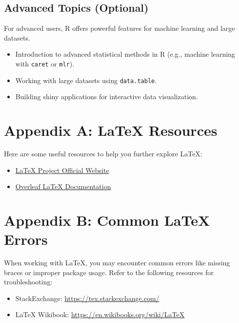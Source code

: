 \documentclass[12pt]{book}
\begin{document}
\section{Advanced Topics (Optional)}
For advanced users, R offers powerful features for machine learning and large datasets.
\begin{itemize}
    \item Introduction to advanced statistical methods in R (e.g., machine learning with \texttt{caret} or \texttt{mlr}).
    \item Working with large datasets using \texttt{data.table}.
    \item Building shiny applications for interactive data visualization.
\end{itemize}



\appendix
\chapter{Appendix A: LaTeX Resources}
Here are some useful resources to help you further explore LaTeX:

\begin{itemize}
    \item \href{https://www.latex-project.org/}{LaTeX Project Official Website}
    \item \href{https://www.overleaf.com/learn}{Overleaf LaTeX Documentation}
\end{itemize}


\chapter{Appendix B: Common LaTeX Errors}
When working with LaTeX, you may encounter common errors like missing braces or improper package usage. Refer to the following resources for troubleshooting:

\begin{itemize}
    \item StackExchange: \url{https://tex.stackexchange.com/}
    \item LaTeX Wikibook: \url{https://en.wikibooks.org/wiki/LaTeX}
\end{itemize}


\newpage
\printbibliography
{}


\newpage
{} %
\printindex
\end{document}
